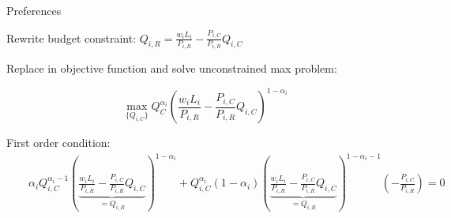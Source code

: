 \documentclass[notes,11pt, aspectratio=169, xcolor=table]{beamer}
\newenvironment{wideitemize}{\itemize\addtolength{\itemsep}{10pt}}{\enditemize}
\begin{document}
\begin{frame}{Preferences}
\begin{wideitemize}
        \item Rewrite budget constraint: $Q_{i,R} = \frac{w_i L_i}{P_{i,R}} - \frac{P_{i,C}}{P_{i,R} } Q_{i,C}$
        \item Replace in objective function and solve unconstrained max problem:

        \begin{equation*}
            \max_{\{Q_{i,C} \}} Q_C^{\alpha_i} \left( \frac{w_i L_i}{P_{i,R}} - \frac{P_{i,C}}{P_{i,R} } Q_{i,C} \right)^{1-\alpha_i}
        \end{equation*}
        \item First order condition: 
\scriptsize{
\begin{eqnarray*}
    & & \alpha_i Q_{i,C}^{\alpha_i-1} \left( \underbrace{\frac{w_i L_i}{P_{i,R}} - \frac{P_{i,C}}{P_{i,R} } Q_{i,C}}_{=Q_{i,R}} \right)^{1-\alpha_i} + Q_{i,C}^{\alpha_i} (1-\alpha_i) \left( \underbrace{\frac{w_i L_i}{P_{i,R}} - \frac{P_{i,C}}{P_{i,R} } Q_{i,C}}_{=Q_{i,R}} \right)^{1-\alpha_i-1} \left( - \frac{P_{i,C}}{P_{i,R}}\right) = 0 \\
\end{eqnarray*}
}
\normalsize
\begin{center}
\end{center}

        \end{wideitemize}
\end{frame}
\end{document}
